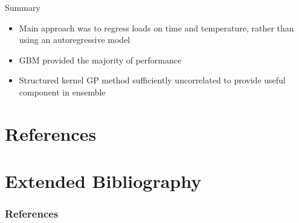 \begin{frame}{Summary}
  \begin{itemize}
    \item Main approach was to regress loads on time and temperature, rather than using an autoregressive model
    \vspace{2\baselineskip}
    \item GBM provided the majority of performance
    \vspace{2\baselineskip}
    \item Structured kernel GP method sufficiently uncorrelated to provide useful component in ensemble
  \end{itemize}
\end{frame}

{
\section{References}
\section{Extended Bibliography}
\tiny
\begin{frame}
  \frametitle{References}
  
  
\end{frame}
}

